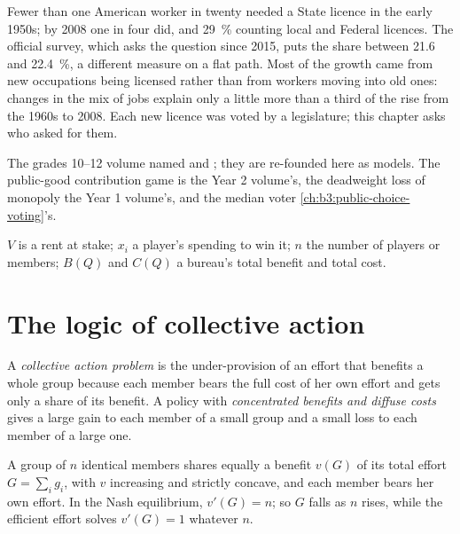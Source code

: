 Fewer than one American worker in twenty needed a State licence in the early 1950s; by
2008 one in four did, and 29~\% counting local and Federal licences. The official survey,
which asks the question since 2015, puts the share between 21.6 and 22.4~\%, a different
measure on a flat path. Most of the growth came from new occupations being licensed
rather than from workers moving into old ones: changes in the mix of jobs explain
only a little more than a third of the rise from the 1960s to 2008. Each new licence was voted by a
legislature; this chapter asks who asked for them.

\begin{recall}
The grades 10--12 volume named  and ; they are
re-founded here as models. The public-good contribution game is the Year 2
volume's, the deadweight loss of monopoly the Year 1 volume's, and the median voter
\cref{ch:b3:public-choice-voting}'s.
\end{recall}

\begin{notation}\label{not:b3:interest-groups-and-regulation:symbols}
$V$ is a rent at stake; $x_i$ a player's spending to win it; $n$ the number of players or
members; $B(Q)$ and $C(Q)$ a bureau's total benefit and total cost.
\end{notation}

\section{The logic of collective action}\label{sec:b3:interest-groups-and-regulation:olson}

\begin{definition}\label{def:b3:interest-groups-and-regulation:collective-action}
A \emph{collective action problem} is the under-provision of an effort that benefits
a whole group because each member bears the full cost of her own effort and gets
only a share of its benefit. A policy with \emph{concentrated benefits and diffuse
costs} gives a large gain to each member of a small group and a small loss to each
member of a large one.
\end{definition}

\begin{proposition}\label{prop:b3:interest-groups-and-regulation:olson}
A group of $n$ identical members shares equally a benefit $v(G)$ of its total effort $G = \sum_i g_i$,
with $v$ increasing and strictly concave, and each member bears her own effort. In the
Nash equilibrium, $v'(G) = n$; so $G$ falls as $n$ rises, while the efficient effort solves
$v'(G) = 1$ whatever $n$.
\end{proposition}

